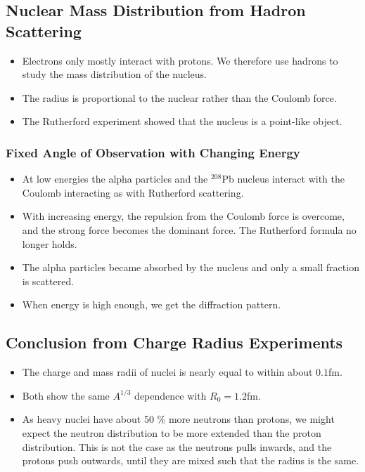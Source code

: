 \documentclass{article}
\begin{document}
\subsection{Nuclear Mass Distribution from Hadron Scattering}\label{subsec: Nuclear Mass Distribution from Hadron Scattering}
\begin{itemize}
    \item Electrons only mostly interact with protons. We therefore use hadrons to study the mass distribution of the nucleus.
    \item The radius is proportional to the nuclear rather than the Coulomb force. 
    \item The Rutherford experiment showed that the nucleus is a point-like object.
\end{itemize}

\subsubsection{Fixed Angle of Observation with Changing Energy}
\begin{itemize}
    \item At low energies the alpha particles and the $^{208}$Pb nucleus interact with the Coulomb interacting as with Rutherford scattering.
    \item With increasing energy, the repulsion from the Coulomb force is overcome, and the strong force becomes the dominant force. The Rutherford formula no longer holds. 
    \item The alpha particles became absorbed by the nucleus and only a small fraction is scattered. 
    \item When energy is high enough, we get the diffraction pattern.
\end{itemize}

\subsection{Conclusion from Charge Radius Experiments}
\begin{itemize}
    \item The charge and mass radii of nuclei is nearly equal to within about $0.1$fm. 
    \item Both show the same $A^{1/3}$ dependence with $R_0 = 1.2$fm. 
    \item As heavy nuclei have about 50 \% more neutrons than protons, we might expect the neutron distribution to be more extended than the proton distribution. This is not the case as the neutrons pulls inwards, and the protons push outwards, until they are mixed such that the radius is the same. 
\end{itemize}
\end{document}
